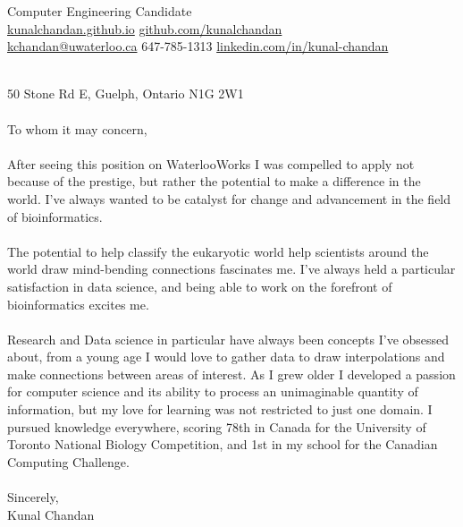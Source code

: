 \documentclass[]{chandan-cv}
\begin{document}
%
%

%
%
{ 
Computer Engineering Candidate \\
\href{http://kunalchandan.github.io}{kunalchandan.github.io}
\hfill
\href{http://github.com/kunalchandan}{github.com/kunalchandan}\\
\href{mailto:kchandan@uwaterloo.ca}{kchandan@uwaterloo.ca}
\hfill
647-785-1313
\hfill 
\href{https://www.linkedin.com/in/kunal-chandan/}{linkedin.com/in/kunal-chandan}
}
\begin{minipage}[t]{0.2\textwidth}
\end{minipage}
\begin{minipage}[t]{0.8\textwidth}
\\
\vspace{50}
\large
50 Stone Rd E,
Guelph, Ontario
N1G 2W1\\
\\
To whom it may concern,\\
\\
After seeing this position on WaterlooWorks I was compelled to apply not because of the prestige, but rather the potential to make a difference in the world. I’ve always wanted to be catalyst for change and advancement in the field of bioinformatics.\\
\\
The potential to help classify the eukaryotic world help scientists around the world draw mind-bending connections fascinates me. I've always held a particular satisfaction in data science, and being able to work on the forefront of bioinformatics excites me.\\
\\
Research and Data science in particular have always been concepts I’ve obsessed about, from a young age I would love to gather data to draw interpolations and make connections between areas of interest. As I grew older I developed a passion for computer science and its ability to process an unimaginable quantity of information, but my love for learning was not restricted to just one domain. I pursued knowledge everywhere, scoring 78th in Canada for the University of Toronto National Biology Competition, and 1st in my school for the Canadian Computing Challenge.\\
\\
Sincerely,\\
Kunal Chandan\\
\\
\end{minipage}

%
%
\end{document}
